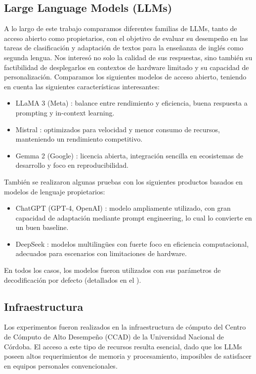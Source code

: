 \subsection{Large Language Models (LLMs)}\label{subsec:llms}
A lo largo de este trabajo comparamos diferentes familias de LLMs, tanto de acceso abierto como propietarios, con el objetivo de evaluar su desempeño en las tareas de clasificación y adaptación de textos para la enseñanza de inglés como segunda lengua. Nos interesó no solo la calidad de sus respuestas, sino también su factibilidad de desplegarlos en contextos de hardware limitado y su capacidad de personalización.
Comparamos los siguientes modelos de acceso abierto, teniendo en cuenta las siguientes características interesantes:
\begin{itemize}
    \item LLaMA 3 (Meta) \cite{llama}: balance entre rendimiento y eficiencia, buena respuesta a prompting y in-context learning.
    \item Mistral \cite{mistral}: optimizados para velocidad y menor consumo de recursos, manteniendo un rendimiento competitivo.
    \item Gemma 2 (Google) \cite{gemma}: licencia abierta, integración sencilla en ecosistemas de desarrollo y foco en reproducibilidad.
\end{itemize}

También se realizaron algunas pruebas con los siguientes productos basados en modelos de lenguaje propietarios:
\begin{itemize}
    \item ChatGPT (GPT-4, OpenAI) \cite{gpt}: modelo ampliamente utilizado, con gran capacidad de adaptación mediante prompt engineering, lo cual lo convierte en un buen baseline.
    \item DeepSeek \cite{deepsek}: modelos multilingües con fuerte foco en eficiencia computacional, adecuados para escenarios con limitaciones de hardware.
\end{itemize}

En todos los casos, los modelos fueron utilizados con sus parámetros de decodificación por defecto (detallados en el ).

\subsection{Infraestructura}\label{subsec:hardware}
Los experimentos fueron realizados en la infraestructura de cómputo del Centro de Cómputo de Alto Desempeño (CCAD) \cite{ccad} de la Universidad Nacional de Córdoba. El acceso a este tipo de recursos resulta esencial, dado que los LLMs poseen altos requerimientos de memoria y procesamiento, imposibles de satisfacer en equipos personales convencionales.

